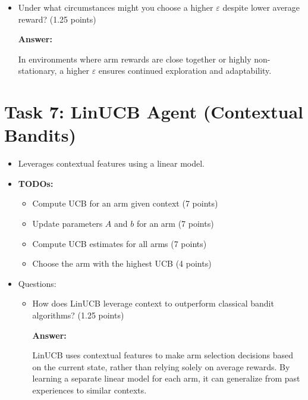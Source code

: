 \documentclass[12pt]{article}
\begin{document}
{{{\begin{itemize}[noitemsep]
\begin{itemize}[noitemsep]
        Higher \(\varepsilon\) values lead to flatter reward curves initially due to more exploration and noise. Lower \(\varepsilon\) curves tend to rise more quickly if the agent exploits a good arm early, but may plateau at suboptimal levels due to insufficient exploration like \(\varepsilon = 0.4,0.2\). the best reward was reached by \(\varepsilon = 0.1\). 

        \item Under what circumstances might you choose a higher \(\varepsilon\) despite lower average reward? (1.25 points)

        \textbf{Answer:}

        In environments where arm rewards are close together or highly non-stationary, a higher \(\varepsilon\) ensures continued exploration and adaptability.

    \end{itemize}
\end{itemize}

\section{Task 7: LinUCB Agent (Contextual Bandits)}
\begin{itemize}[noitemsep]
    \item Leverages contextual features using a linear model.
    \item \textbf{TODOs:}
    \begin{itemize}[noitemsep]
        \item Compute UCB for an arm given context (7 points)
        \item Update parameters \(A\) and \(b\) for an arm (7 points)
        \item Compute UCB estimates for all arms (7 points)
        \item Choose the arm with the highest UCB (4 points)
    \end{itemize}
    \item Questions:
    \begin{itemize}[noitemsep]
        \item How does LinUCB leverage context to outperform classical bandit algorithms? (1.25 points)

        \textbf{Answer:}

        LinUCB uses contextual features to make arm selection decisions based on the current state, rather than relying solely on average rewards. By learning a separate linear model for each arm, it can generalize from past experiences to similar contexts.


\end{itemize}
\end{itemize}}}}
\end{document}
